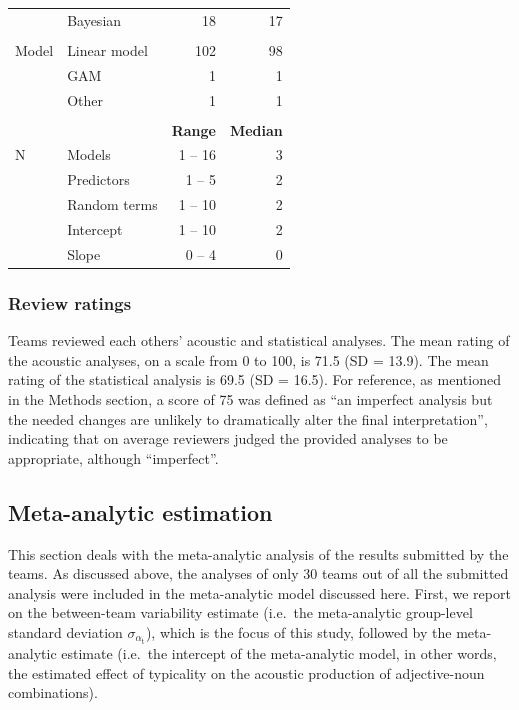 \documentclass[Review,times,sageh]{sagej}
\begin{document}
\begin{table}
{\begin{tabular}[t]{llrr}
 & Bayesian & 18 & 17\\
 &  &  \vphantom{1} & \\
\hspace{1em}Model & Linear model & 102 & 98\\
 & GAM & 1 & 1\\
 & Other & 1 & 1\\
 &  &  & \\
 &  & \bf{Range} & \bf{Median}\\
\hspace{1em}N & Models & 1 -- 16 & 3\\
 & Predictors & 1 -- 5 & 2\\
 & Random terms & 1 -- 10 & 2\\
\hspace{1em} & \hspace{1em}Intercept & \hspace{1em}1 -- 10 & \hspace{1em}2\\
\hspace{1em} & \hspace{1em}Slope & \hspace{1em}0 -- 4 & \hspace{1em}0\\
\bottomrule
\end{tabular}}
\end{table}

\hypertarget{review-ratings}{%
\subsubsection{Review ratings}\label{review-ratings}}

Teams reviewed each others' acoustic and statistical analyses.
The mean rating of the acoustic analyses, on a scale from 0 to 100, is 71.5 (SD = 13.9).
The mean rating of the statistical analysis is 69.5 (SD = 16.5).
For reference, as mentioned in the Methods section, a score of 75 was defined as ``an imperfect analysis but the needed changes are unlikely to dramatically alter the final interpretation'', indicating that on average reviewers judged the provided analyses to be appropriate, although ``imperfect''.

\hypertarget{meta-est-2}{%
\subsection{Meta-analytic estimation}\label{meta-est-2}}

This section deals with the meta-analytic analysis of the results submitted by the teams.
As discussed above, the analyses of only 30 teams out of all the submitted analysis were included in the meta-analytic model discussed here.
First, we report on the between-team variability estimate (i.e.~the meta-analytic group-level standard deviation \(\sigma_{\alpha_{\text{t}}}\)), which is the focus of this study, followed by the meta-analytic estimate (i.e.~the intercept of the meta-analytic model, in other words, the estimated effect of typicality on the acoustic production of adjective-noun combinations).
\end{document}
